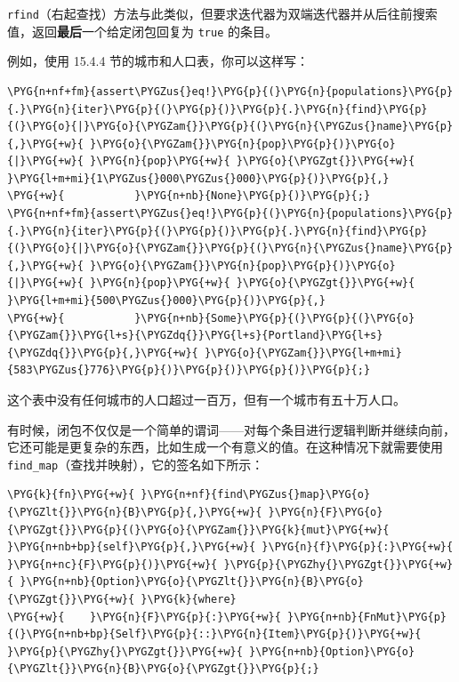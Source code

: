 \texttt{rfind}（右起查找）方法与此类似，但要求迭代器为双端迭代器并从后往前搜索值，返回\textbf{最后}一个给定闭包回复为 \texttt{true} 的条目。

例如，使用 15.4.4 节的城市和人口表，你可以这样写：

\begin{Verbatim}[commandchars=\\\{\},breaklines=true,breakanywhere=true,fontsize=\codefont,xleftmargin=17bp]
\PYG{n+nf+fm}{assert\PYGZus{}eq!}\PYG{p}{(}\PYG{n}{populations}\PYG{p}{.}\PYG{n}{iter}\PYG{p}{(}\PYG{p}{)}\PYG{p}{.}\PYG{n}{find}\PYG{p}{(}\PYG{o}{|}\PYG{o}{\PYGZam{}}\PYG{p}{(}\PYG{n}{\PYGZus{}name}\PYG{p}{,}\PYG{+w}{ }\PYG{o}{\PYGZam{}}\PYG{n}{pop}\PYG{p}{)}\PYG{o}{|}\PYG{+w}{ }\PYG{n}{pop}\PYG{+w}{ }\PYG{o}{\PYGZgt{}}\PYG{+w}{ }\PYG{l+m+mi}{1\PYGZus{}000\PYGZus{}000}\PYG{p}{)}\PYG{p}{,}
\PYG{+w}{           }\PYG{n+nb}{None}\PYG{p}{)}\PYG{p}{;}
\PYG{n+nf+fm}{assert\PYGZus{}eq!}\PYG{p}{(}\PYG{n}{populations}\PYG{p}{.}\PYG{n}{iter}\PYG{p}{(}\PYG{p}{)}\PYG{p}{.}\PYG{n}{find}\PYG{p}{(}\PYG{o}{|}\PYG{o}{\PYGZam{}}\PYG{p}{(}\PYG{n}{\PYGZus{}name}\PYG{p}{,}\PYG{+w}{ }\PYG{o}{\PYGZam{}}\PYG{n}{pop}\PYG{p}{)}\PYG{o}{|}\PYG{+w}{ }\PYG{n}{pop}\PYG{+w}{ }\PYG{o}{\PYGZgt{}}\PYG{+w}{ }\PYG{l+m+mi}{500\PYGZus{}000}\PYG{p}{)}\PYG{p}{,}
\PYG{+w}{           }\PYG{n+nb}{Some}\PYG{p}{(}\PYG{p}{(}\PYG{o}{\PYGZam{}}\PYG{l+s}{\PYGZdq{}}\PYG{l+s}{Portland}\PYG{l+s}{\PYGZdq{}}\PYG{p}{,}\PYG{+w}{ }\PYG{o}{\PYGZam{}}\PYG{l+m+mi}{583\PYGZus{}776}\PYG{p}{)}\PYG{p}{)}\PYG{p}{)}\PYG{p}{;}
\end{Verbatim}

这个表中没有任何城市的人口超过一百万，但有一个城市有五十万人口。

有时候，闭包不仅仅是一个简单的谓词——对每个条目进行逻辑判断并继续向前，它还可能是更复杂的东西，比如生成一个有意义的值。在这种情况下就需要使用 \texttt{find\_map}（查找并映射），它的签名如下所示：

\begin{Verbatim}[commandchars=\\\{\},breaklines=true,breakanywhere=true,fontsize=\codefont,xleftmargin=17bp]
\PYG{k}{fn}\PYG{+w}{ }\PYG{n+nf}{find\PYGZus{}map}\PYG{o}{\PYGZlt{}}\PYG{n}{B}\PYG{p}{,}\PYG{+w}{ }\PYG{n}{F}\PYG{o}{\PYGZgt{}}\PYG{p}{(}\PYG{o}{\PYGZam{}}\PYG{k}{mut}\PYG{+w}{ }\PYG{n+nb+bp}{self}\PYG{p}{,}\PYG{+w}{ }\PYG{n}{f}\PYG{p}{:}\PYG{+w}{ }\PYG{n+nc}{F}\PYG{p}{)}\PYG{+w}{ }\PYG{p}{\PYGZhy{}\PYGZgt{}}\PYG{+w}{ }\PYG{n+nb}{Option}\PYG{o}{\PYGZlt{}}\PYG{n}{B}\PYG{o}{\PYGZgt{}}\PYG{+w}{ }\PYG{k}{where}
\PYG{+w}{    }\PYG{n}{F}\PYG{p}{:}\PYG{+w}{ }\PYG{n+nb}{FnMut}\PYG{p}{(}\PYG{n+nb+bp}{Self}\PYG{p}{::}\PYG{n}{Item}\PYG{p}{)}\PYG{+w}{ }\PYG{p}{\PYGZhy{}\PYGZgt{}}\PYG{+w}{ }\PYG{n+nb}{Option}\PYG{o}{\PYGZlt{}}\PYG{n}{B}\PYG{o}{\PYGZgt{}}\PYG{p}{;}
\end{Verbatim}

